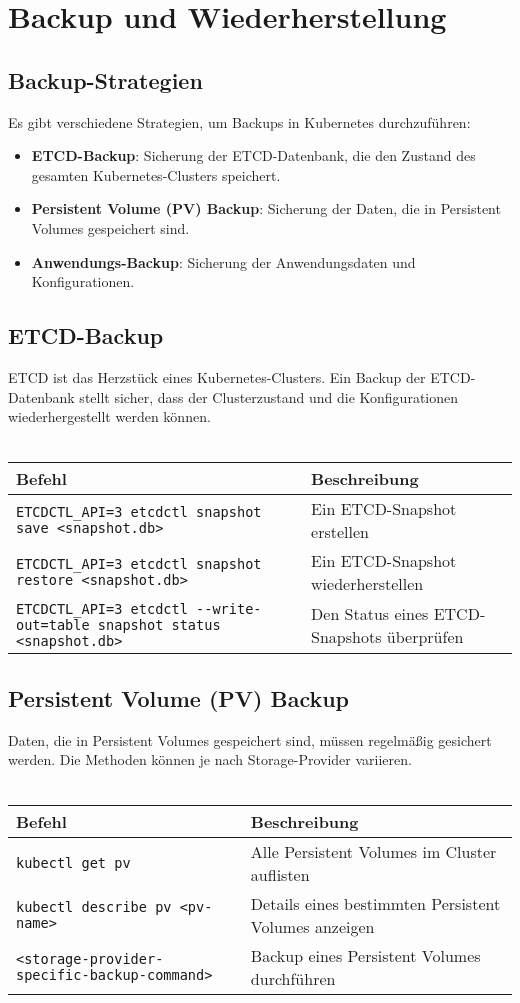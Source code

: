 \chapter{Backup und Wiederherstellung}

\section{Backup-Strategien}
Es gibt verschiedene Strategien, um Backups in Kubernetes durchzuführen:
\begin{itemize}
    \item \textbf{ETCD-Backup}: Sicherung der ETCD-Datenbank, die den Zustand des gesamten Kubernetes-Clusters speichert.
    \item \textbf{Persistent Volume (PV) Backup}: Sicherung der Daten, die in Persistent Volumes gespeichert sind.
    \item \textbf{Anwendungs-Backup}: Sicherung der Anwendungsdaten und Konfigurationen.
\end{itemize}

\section{ETCD-Backup}
ETCD ist das Herzstück eines Kubernetes-Clusters. Ein Backup der ETCD-Datenbank stellt sicher, dass der Clusterzustand und die Konfigurationen wiederhergestellt werden können.\\
\phantom{.}\\
\begin{tabular}{|p{}|p{}|}
\hline
\textbf{Befehl} & \textbf{Beschreibung} \\
\hline
\texttt{ETCDCTL\_API=3 etcdctl snapshot save <snapshot.db>} & Ein ETCD-Snapshot erstellen \\
\texttt{ETCDCTL\_API=3 etcdctl snapshot restore <snapshot.db>} & Ein ETCD-Snapshot wiederherstellen \\
\texttt{ETCDCTL\_API=3 etcdctl {-}{-}write-out=table snapshot status <snapshot.db>} & Den Status eines ETCD-Snapshots überprüfen \\
\hline
\end{tabular}

\section{Persistent Volume (PV) Backup}
Daten, die in Persistent Volumes gespeichert sind, müssen regelmäßig gesichert werden. Die Methoden können je nach Storage-Provider variieren.\\
\phantom{.}\\
\begin{tabular}{|l|l|}
\hline
\textbf{Befehl} & \textbf{Beschreibung} \\
\hline
\texttt{kubectl get pv} & Alle Persistent Volumes im Cluster auflisten \\
\texttt{kubectl describe pv <pv-name>} & Details eines bestimmten Persistent Volumes anzeigen \\
\texttt{<storage-provider-specific-backup-command>} & Backup eines Persistent Volumes durchführen \\
\hline
\end{tabular}

